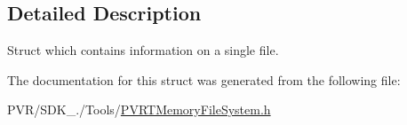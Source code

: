\subsection{Detailed Description}
Struct which contains information on a single file. 



 

The documentation for this struct was generated from the following file\+:\begin{DoxyCompactItemize}
\item 
P\+V\+R/\+S\+D\+K\+\_./\+Tools/\hyperlink{_p_v_r_t_memory_file_system_8h}{P\+V\+R\+T\+Memory\+File\+System.\+h}\end{DoxyCompactItemize}
